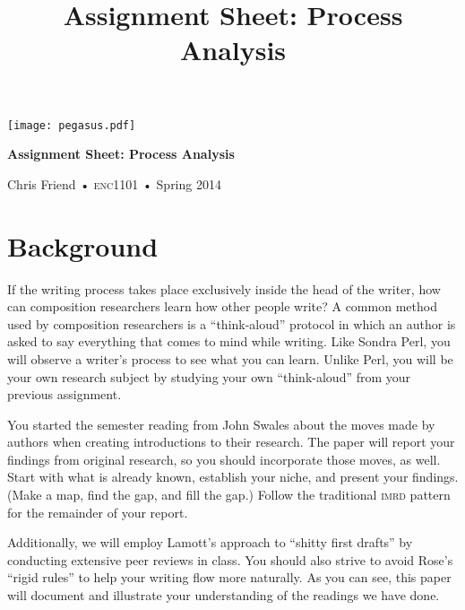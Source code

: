 \documentclass[10pt, oneside]{amsart}	%
\title[Process Analysis]{Assignment Sheet: Process Analysis}
\begin{document}
%
\thispagestyle{empty}
\vspace{-2in}
\begin{center}
\huge
\texttt{[image: pegasus.pdf]}

\textbf{Assignment Sheet: Process Analysis}

{\normalsize Chris Friend • \textsc{enc1101} • Spring 2014}
\end{center}
\vspace{1.5\baselineskip}

\section{Background} %
\label{sec:background}
If the writing process takes place exclusively inside the head of the writer, how can composition researchers learn how other people write? A common method used by composition researchers is a “think-aloud” protocol in which an author is asked to say everything that comes to mind while writing. Like Sondra Perl, you will observe a writer's process to see what you can learn. Unlike Perl, you will be your own research subject by studying your own “think-aloud” from your previous assignment.

You started the semester reading from John Swales about the moves made by authors when creating introductions to their research. The paper will report your findings from original research, so you should incorporate those moves, as well. Start with what is already known, establish your niche, and present your findings. (Make a map, find the gap, and fill the gap.) Follow the traditional \textsc{imrd} pattern for the remainder of your report.

Additionally, we will employ Lamott's approach to “shitty first drafts” by conducting extensive peer reviews in class. You should also strive to avoid Rose's “rigid rules” to help your writing flow more naturally. As you can see, this paper will document and illustrate your understanding of the readings we have done.

\begin{comment}
	\section{Purpose} %
	\label{sec:purpose}
	\begin{itemize}
		\item To better understand yourself as a writer
		\item To relate your writing process with the processes of others we have read about
		\item To practice writing in an academic genre
		\item To use the \textsc{cars} and \textsc{imrd} models in your writing, where appropriate
		\item To understand research as a process of genuine inquiry
	\end{itemize}
\end{comment}
\end{document}
